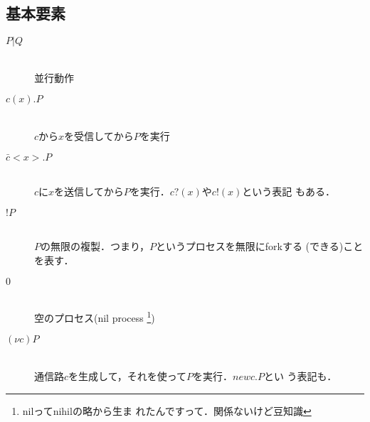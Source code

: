 \subsection{基本要素}
\begin{description}
 \item[$P|Q$] \mbox{}\\
            並行動作

 \item[$c(x) . P$] \mbox{}\\
            $c$から$x$を受信してから$P$を実行

 \item[$\bar{c}<x> . P$] \mbox{}\\
            $c$に$x$を送信してから$P$を実行．$c?(x)$や$c!(x)$という表記
            もある．

 \item[$!P$] \mbox{}\\
            $P$の無限の複製．つまり，$P$というプロセスを無限にforkする
            (できる)ことを表す．

 \item[$0$] \mbox{}\\
            空のプロセス(nil process \footnote{nilってnihilの略から生ま
            れたんですって．関係ないけど豆知識})

 \item[$(\nu c)P$] \mbox{} \\
            通信路$c$を生成して，それを使って$P$を実行．$new c . P$とい
            う表記も．
\end{description}

